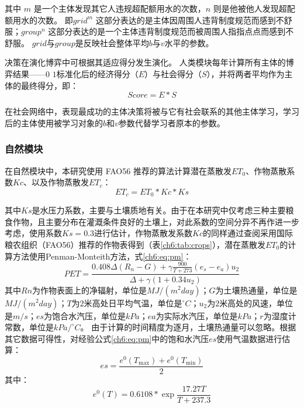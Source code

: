 其中 $m$ 是一个主体发现其它人违规超配额用水的次数，$n$ 则是他被他人发现超配额用水的次数。
即$grid^m$ 这部分表达的是主体因周围人违背制度规范而感到不舒服；$group^n$ 这部分表达的是一个主体违背制度规范而被周围人指指点点而感到不舒服。
$grid$与$group$是反映社会整体平均$b$与$v$水平的参数。

决策在演化博弈中可根据其适应得分发生演化。
人类模块每年计算所有主体的博弈结果——$0$ \textendash{} $1$标准化后的经济得分（$E$）与社会得分（$S$），并将两者平均作为主体的最终得分，即：
\begin{equation}
    \label{ch6:eq:score}
    Score = E * S
\end{equation}

在社会网络中，表现最成功的主体决策将被与它有社会联系的其他主体学习，学习后的主体使用被学习对象的$b$和$v$参数代替学习者原本的参数。

\subsubsection{自然模块}

在自然模块中，本研究使用 FAO56 推荐的算法计算潜在蒸散发$ET_0$、作物蒸散系数$Kc$、以及作物蒸散发$ET_c$：
\begin{equation}
    ET_c = ET_0 * Kc * Ks
    \label{ch6:eq:etc}
\end{equation}

其中$Ks$是水压力系数，主要与土壤质地有关。由于在本研究中仅考虑三种主要粮食作物，且主要分布在灌溉条件良好的土壤上，对此系数的空间分异不再作进一步考虑，使用系数$Ks = 0.3$进行估计，作物蒸散发系数$Kc$的同样通过查阅采用国际粮农组织（FAO56）推荐的作物表得到（表\ref{ch6:tab:crops}）\cite{chen2023}，潜在蒸散发$ET_0$的计算方法使用Penman-Monteith方法，式\ref{ch6:eq:pm}：
\begin{equation}
    \label{ch6:eq:pm}
    PET = \frac{0.408 \Delta (R_{n}-G)+\gamma \frac{900}{T+273}
    (e_s-e_a) u_2}{\Delta+\gamma(1+0.34 u_2)}
\end{equation}
其中$Rn$为作物表面上的净辐射，单位是$MJ/(m^2 day)$；$G$为土壤热通量，单位是$MJ/(m^2 day)$；$T$为$2$米高处日平均气温，单位是$^\circ C$；$u_2$为$2$米高处的风速，单位是$m/s$；$es$为饱合水汽压，单位是$kPa$；$ea$为实际水汽压，单位是$kPa$；$r$为湿度计常数，单位是$kPa/^\circ C$。
由于计算的时间精度为逐月，土壤热通量可以忽略。根据其它数据可得性，对经验公式\ref{ch6:eq:pm}中的饱和水汽压$es$使用气温数据进行估算：
\begin{equation}
    es = \frac{e^0(T_{\max}) + e^0(T_{\min})}{2}
\end{equation}
其中：
\begin{equation}
    e^0(T) = 0.6108 * \exp \frac{17.27 T}{T + 237.3}
\end{equation}

